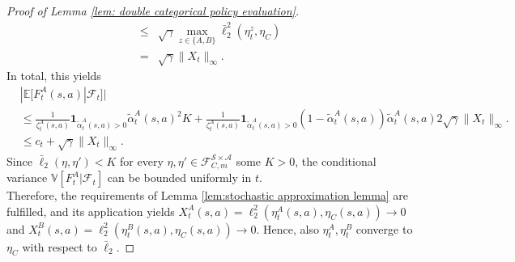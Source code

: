 \documentclass{article}
\newcommand{\cA}{\mathcal{A}}
\newcommand{\cF}{\mathcal{F}}
\newcommand{\cS}{\mathcal{S}}
\newcommand{\E}{\mathbb{E}}
\newcommand{\V}{\mathbb{V}}
\theoremstyle{plain}
\theoremstyle{definition}
\theoremstyle{remark}
\begin{document}
\begin{proof}[Proof of Lemma \ref{lem: double categorical policy evaluation}]
\begin{align*}
    \leq&\sqrt{\gamma}\max_{z\in\{A,B\}}\bar\ell_2^2(\eta^z_{t},\eta_C)\\
    =&\sqrt{\gamma}\|X_t\|_\infty.
\end{align*}
    In total, this yields
    \begin{align*}
        &|\E[F^A_t(s,a)|\cF_t]|\\
        &\leq \frac{1}{\zeta_t^A(s,a)}\textbf{1}_{\tilde\alpha^A_t(s,a)>0}{\tilde\alpha^A_t}(s,a)^2 K + \frac{1}{\zeta_t^A(s,a)}\textbf{1}_{\tilde\alpha^A_t(s,a)>0}(1-\tilde\alpha^A_t(s,a))\tilde\alpha^A_t(s,a)2\sqrt{\gamma}\|X_t\|_\infty.\\
        &\leq c_t + \sqrt{\gamma}\|X_t\|_\infty.
    \end{align*}    
    Since $\bar\ell_2(\eta,\eta')<K$ for every $\eta,\eta'\in\cF_{C,m}^{\cS\times\cA}$ some $K>0$, the conditional variance $\V[F^A_t|\cF_t]$ can be bounded uniformly in $t$. \\
    Therefore, the requirements of Lemma \ref{lem:stochastic approximation lemma} are fulfilled, and its application yields $X_t^A(s,a)=\ell_2^2(\eta_t^A(s,a),\eta_C(s,a))\to0$ and $X_t^B(s,a)=\ell_2^2(\eta_t^B(s,a),\eta_C(s,a))\to0$. Hence, also $\eta_t^A,\eta_t^B$ converge to $\eta_C$ with respect to $\bar\ell_2$.
\end{proof}
\end{document}
